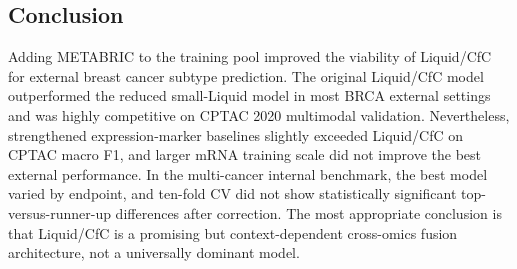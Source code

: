 \subsection{Conclusion}

Adding METABRIC to the training pool improved the viability of Liquid/CfC for external breast cancer subtype prediction. The original Liquid/CfC model outperformed the reduced small-Liquid model in most BRCA external settings and was highly competitive on CPTAC 2020 multimodal validation. Nevertheless, strengthened expression-marker baselines slightly exceeded Liquid/CfC on CPTAC macro F1, and larger mRNA training scale did not improve the best external performance. In the multi-cancer internal benchmark, the best model varied by endpoint, and ten-fold CV did not show statistically significant top-versus-runner-up differences after correction. The most appropriate conclusion is that Liquid/CfC is a promising but context-dependent cross-omics fusion architecture, not a universally dominant model.
